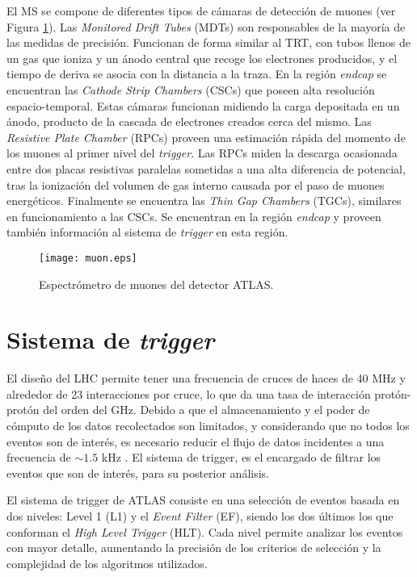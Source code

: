 El MS se compone de diferentes tipos de cámaras de detección de muones (ver Figura \ref{muon}). Las \textit{Monitored Drift Tubes} (MDTs) son responsables de la mayoría de las medidas de precisión. Funcionan de forma similar al TRT, con tubos llenos de un gas que ioniza y un ánodo central que recoge los electrones producidos, y el tiempo de deriva se asocia con la distancia a la traza. En la región \textit{endcap} se encuentran las \textit{Cathode Strip Chambers} (CSCs) que poseen alta resolución espacio-temporal. Estas cámaras funcionan midiendo la carga depositada en un ánodo, producto de la cascada de electrones creados cerca del mismo. Las \textit{Resistive Plate Chamber} (RPCs) proveen una estimación rápida del momento de los muones al primer nivel del \textit{trigger}. Las RPCs miden la descarga ocasionada entre dos placas resistivas paralelas sometidas a una alta diferencia de potencial, tras la ionización del volumen de gas interno causada por el paso de muones energéticos. Finalmente se encuentra las \textit{Thin Gap Chambers} (TGCs), similares en funcionamiento a las CSCs. Se encuentran en la región \textit{endcap} y proveen también información al sistema de \textit{trigger} en esta región.


\begin{figure}
\centering
\texttt{[image: muon.eps]}
\caption{Espectrómetro de muones del detector ATLAS.}
\label{muon}
\end{figure}



\section{Sistema de \textit{trigger}}

El diseño del LHC permite tener una frecuencia de cruces de haces de 40 MHz y alrededor de 23 interacciones por cruce, lo que da una tasa de interacción protón-protón del orden del GHz. Debido a que el almacenamiento y el poder de cómputo de los datos recolectados son limitados, y considerando que no todos los eventos son de interés, es necesario reducir el flujo de datos incidentes a una frecuencia de $\sim 1.5$ kHz \cite{PERF-2011-02}. El sistema de trigger, es el encargado de filtrar los eventos que son de interés, para su posterior análisis. 

El sistema de trigger de ATLAS consiste en una selección de eventos basada en dos niveles: Level 1 (L1) y el \textit{Event Filter} (EF), siendo los dos últimos los que conforman el \textit{High Level Trigger} (HLT). Cada nivel permite analizar los eventos con mayor detalle, aumentando la precisión de los criterios de selección y la complejidad de los algoritmos utilizados.

